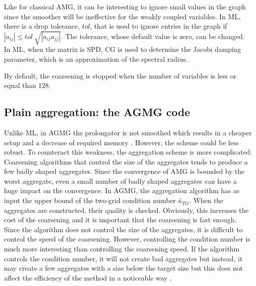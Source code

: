 Like for classical AMG, it can be interesting to ignore small values in
the graph since the smoother will be ineffective for the weakly coupled
variables. In ML, there is a drop tolerance, $tol$, that is used to ignore
entries in the graph if $|a_{ij}| \leq tol\ \sqrt{|a_{ij} a_{jj}|}$. The
tolerance, whose default value is zero, can be changed.  In ML, when the 
matrix is SPD, CG is used to determine the Jacobi damping parameter, which 
is an approximation of the spectral radius.

By default, the coarsening is stopped when the number of variables is less 
or equal than 128.

\subsection{Plain aggregation: the AGMG code}
Unlike ML, in AGMG the prolongator is not smoothed which results in a
cheaper setup and a decrease of required memory \cite{agmg2}. However, 
the scheme could be less robust. To counteract this weakness, 
the aggregation scheme is more complicated. Coarsening algorithms that control
the size of the aggregates tends to produce a few badly shaped aggregates.
Since the convergence of AMG is bounded by the worst aggregate, even a small 
number of badly shaped aggregates can have a huge impact on the convergence. 
In AGMG, the aggregation algorithm has as input the upper bound of the 
two-grid condition number $\bar{\kappa}_{TG}$. When the aggregates are constructed,
their quality is checked. Obviously, this increases the cost of the coarsening
and it is important that the coarsening is fast enough. Since the algorithm 
does not control the size of the aggregates, it is difficult to control the 
speed of the coarsening. However, controlling the condition number is much 
more interesting than controlling the coarsening speed. If the algorithm 
controls the condition number, it will not create bad aggregates but instead, it 
may create a few aggregates with a size below the target size but this 
does not affect the efficiency of the method in a noticeable way \cite{agmg2}. 

